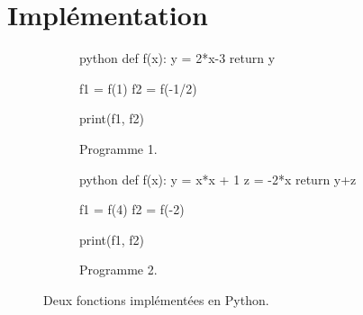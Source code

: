 


\section{Implémentation}





\begin{figure}[!htb]
	\begin{subfigure}[b]{.45\textwidth}
\begin{mintedbox}{python}
def f(x):
y = 2*x-3
return y

f1 = f(1)
f2 = f(-1/2)


print(f1, f2)
\end{mintedbox}
	\caption{Programme 1.}
	\label{python:1}
	\end{subfigure}
	\begin{subfigure}[b]{.45\textwidth}
\begin{mintedbox}{python}
def f(x):
y = x*x + 1
z = -2*x
return y+z

f1 = f(4)
f2 = f(-2)

print(f1, f2)
\end{mintedbox}
	\caption{Programme 2.}
	\label{python:2}
	\end{subfigure}
	\caption{Deux fonctions implémentées en Python.}
	\label{python:1-2}
\end{figure}
